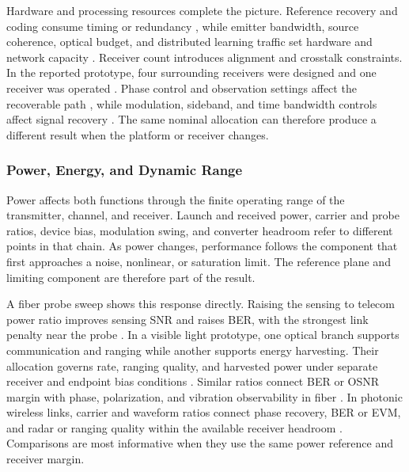 Hardware and processing resources complete the picture. Reference recovery and
coding consume timing or redundancy
\cite{OISAC_SCR00278,OISAC_SCR00607,OISAC_SCR00730}, while emitter bandwidth,
source coherence, optical budget, and distributed learning traffic set hardware
and network capacity
\cite{OISAC_SCR00763,OISAC_SCR01071,OISAC_SCR01073,OISAC_SCR01081}. Receiver
count introduces alignment and crosstalk constraints. In the reported
prototype, four surrounding receivers were designed and one receiver was
operated \cite{OISAC_SCR00619}. Phase control and observation settings affect the
recoverable path \cite{OISAC_SCR01085,OISAC_SCR01103}, while modulation,
sideband, and time bandwidth controls affect signal recovery
\cite{OISAC_SCR01152,OISAC_SCR01153,OISAC_SCR01188}. The same nominal allocation
can therefore produce a different result when the platform or receiver changes.

\subsubsection{Power, Energy, and Dynamic Range}

Power affects both functions through the finite operating range of the
transmitter, channel, and receiver. Launch and received power, carrier and
probe ratios, device bias, modulation swing, and converter headroom refer to
different points in that chain. As power changes, performance follows the
component that first approaches a noise, nonlinear, or saturation limit. The
reference plane and limiting component are therefore part of the result.

A fiber probe sweep shows this response directly. Raising the sensing to
telecom power ratio improves sensing SNR and raises BER, with the strongest link
penalty near the probe \cite{OISAC_SCR00057}. In a visible light prototype, one
optical branch supports communication and ranging while another supports
energy harvesting. Their allocation governs rate, ranging quality, and
harvested power under separate receiver and endpoint bias conditions
\cite{OISAC_SCR01025}. Similar ratios connect BER or OSNR margin with phase,
polarization, and vibration observability in fiber
\cite{OISAC_SCR00013,OISAC_SCR00072,OISAC_SCR00220,OISAC_SCR00099,OISAC_SCR00592}.
In photonic wireless links, carrier and waveform ratios connect phase recovery,
BER or EVM, and radar or ranging quality within the available receiver headroom
\cite{OISAC_SCR00492,OISAC_SCR00954,OISAC_SCR00966,OISAC_SCR00985}.
Comparisons are most informative when they use the same power reference and
receiver margin.

